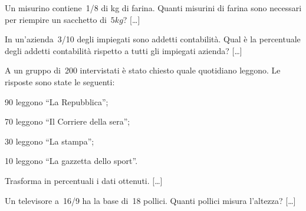 \begin{multicols}{2}
\begin{esercizio}
\label{ese:3.183}
 Un misurino contiene~1/8 di kg di farina. Quanti misurini di farina
sono necessari per riempire un sacchetto di~\(5\unit{kg}\)? \hfill [\dots]
\end{esercizio}

% 
% 

\begin{esercizio}
\label{ese:3.187}
 In un'azienda~3/10 degli impiegati sono addetti
contabilità. Qual è la percentuale degli addetti contabilità
rispetto a tutti gli impiegati azienda? \hfill [\dots]
\end{esercizio}

\begin{esercizio}
\label{ese:3.188}
 A un gruppo di~200 intervistati è stato chiesto quale quotidiano
leggono. Le risposte sono state le seguenti:
\begin{itemize*}
\item 90 leggono ``La Repubblica'';
\item 70 leggono ``Il Corriere della sera'';
\item 30 leggono ``La stampa'';
\item 10 leggono ``La gazzetta dello sport''.
\end{itemize*}
Trasforma in percentuali i dati ottenuti. \hfill [\dots]
\end{esercizio}

\begin{esercizio}
\label{ese:3.196}
Un televisore a~16/9 ha la base di~18 pollici. Quanti
pollici misura l'altezza? \hfill [\dots]
\end{esercizio}


\end{multicols}
